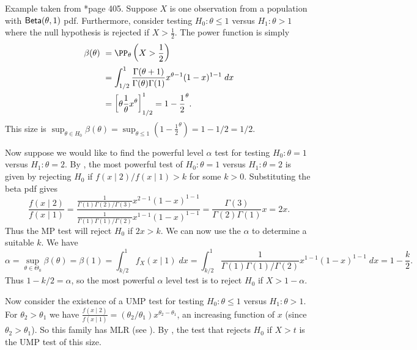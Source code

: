\begin{exam} \label{exam: beta-kr}
    Example taken from \cite{CasellaGeorge2001SI}*{page 405}. Suppose $X$ is one observation from a population with ${\sf Beta} (\theta , 1)$ pdf. Furthermore, consider testing $H_0 : \theta \leq 1$ versus $H_1 : \theta > 1$ where the null hypothesis is rejected if $X > \frac{1}{2}$. The power function is simply
    \begin{align*}
        \beta (\theta) \
         & = \PP_{\theta} \left( X > \frac{1}{2} \right)                                                            \\
         & = \int_{1/2}^{1} \frac{\Gamma (\theta + 1)}{\Gamma (\theta) \Gamma (1)} x^{\theta - 1} (1-x)^{1-1} \; dx \\
         & = \left[ \theta \frac{1}{\theta} x^{\theta} \right]_{1/2}^1 = 1 - \frac{1}{2}^{\theta}.
    \end{align*}
    This size is $\sup_{\theta \in H_0} \beta (\theta) = \sup_{\theta \leq 1} \left( 1- \frac{1}{2}^{\theta} \right) = 1 - 1/2 = 1/2$.

    Now suppose we would like to find the powerful level $\alpha$ test for testing $H_0 : \theta = 1$ versus $H_1 : \theta = 2$. By , the most powerful test of $H_0 : \theta = 1$ versus $H_1 : \theta = 2$ is given by rejecting $H_0$ if $f(x \mid 2) / f(x \mid 1) > k$ for some $k > 0$. Substituting the beta pdf gives
    \begin{equation*}
        \frac{f(x\mid 2)}{f(x \mid 1)} = \frac{\frac{1}{\Gamma (1) \Gamma (2) / \Gamma (3)} x^{2-1} (1-x)^{1-1}}{\frac{1}{\Gamma (1) \Gamma (1) / \Gamma (2)} x^{1-1} (1-x)^{1-1}} = \frac{\Gamma (3)}{\Gamma (2) \Gamma (1)} x = 2x.
    \end{equation*}
    Thus the MP test will reject $H_0$ if $2x > k$. We can now use the $\alpha$ to determine a suitable $k$. We have
    \begin{equation*}
        \alpha = \sup_{\theta \in \Theta_0} \beta (\theta) = \beta (1) = \int_{k/2}^{1} f_{X} (x \mid 1) \; dx = \int_{k/2}^{1} \frac{1}{\Gamma (1) \Gamma (1) / \Gamma (2)} x^{1-1} (1-x)^{1-1} \; dx = 1- \frac{k}{2}.
    \end{equation*}
    Thus $1 - k/2 = \alpha$, so the most powerful $\alpha$ level test is to reject $H_0$ if $X > 1 - \alpha$.

    Now consider the existence of a UMP test for testing $H_0 : \theta \leq 1$ versus $H_1 : \theta > 1$. For $\theta_2 > \theta_1$ we have $\frac{f(x\mid 2)}{f(x \mid 1)} = (\theta_2 / \theta_1) x^{\theta_2 - \theta_1}$, an increasing function of $x$ (since $\theta_2 > \theta_1$). So this family has MLR (see ). By , the test that rejects $H_0$ if $X > t$ is the UMP test of this size.
\end{exam}